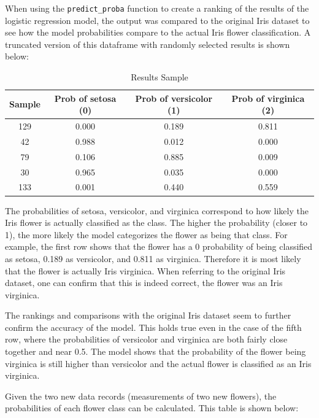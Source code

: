 \documentclass[journal]{IEEEtran}
\begin{document}
When using the \lstinline{predict_proba} function to create a ranking of the results of the logistic regression model, the output was compared to the original Iris dataset to see how the model probabilities compare to the actual Iris flower classification. A truncated version of this dataframe with randomly selected results is shown below:

\begin{table}[h!]
\centering
\begin{tabular}{ c | c c c }
Sample & Prob of setosa (0) &	Prob of versicolor (1) & Prob of virginica (2) \\ 
\hline
129	& 0.000	& 0.189	& 0.811 \\
42	& 0.988	& 0.012	& 0.000 \\
79	& 0.106	& 0.885	& 0.009 \\
30	& 0.965	& 0.035	& 0.000 \\
133	& 0.001	& 0.440	& 0.559
\end{tabular}
\caption{Results Sample}
\label{table:model-comparison-table}
\end{table}

The probabilities of setosa, versicolor, and virginica correspond to how likely the Iris flower is actually classified as the class. The higher the probability (closer to 1), the more likely the model categorizes the flower as being that class. For example, the first row shows that the flower has a 0 probability of being classified as setosa, 0.189 as versicolor, and 0.811 as virginica. Therefore it is most likely that the flower is actually Iris virginica. When referring to the original Iris dataset, one can confirm that this is indeed correct, the flower was an Iris virginica. 

The rankings and comparisons with the original Iris dataset seem to further confirm the accuracy of the model. This holds true even in the case of the fifth row, where the probabilities of versicolor and virginica are both fairly close together and near 0.5. The model shows that the probability of the flower being virginica is still higher than versicolor and the actual flower is classified as an Iris virginica. 

Given the two new data records (measurements of two new flowers), the probabilities of each flower class can be calculated. This table is shown below: 
    
\end{document}
